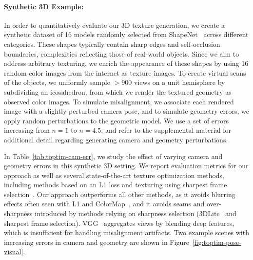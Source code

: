 \paragraph*{Synthetic 3D Example:}
In order to quantitatively evaluate our 3D texture generation, we create a synthetic dataset of 16 models randomly selected from ShapeNet~\cite{chang2015shapenet} across different categories. 
These shapes typically contain sharp edges and self-occlusion boundaries, complexities reflecting those of real-world objects.
Since we aim to address arbitrary texturing, we enrich the appearance of these shapes by using 16 random color images from the internet as texture images. 
To create virtual scans of the objects, we uniformly sample $>900$ views on a unit hemisphere by subdividing an icosahedron, from which we render the textured geometry as observed color images. 
To simulate misalignment, we associate each rendered image with a slightly perturbed camera pose, and to simulate geometry errors, we apply random perturbations to the geometric model.
We use a set of errors increasing from $n=1$ to $n=4.5$, and refer to the supplemental material for additional detail regarding generating camera and geometry perturbations.


In Table~\ref{tab:toptim-cam-err}, we study the effect of varying camera and geometry errors in this synthetic 3D setting.  We report evaluation metrics for our approach as well as several state-of-the-art texture optimization methods, including methods based on an L1 loss and texturing using sharpest frame selection~\cite{vu2011bf}.
Our approach outperforms all other methods, as it avoids blurring effects often seen with L1 and ColorMap~\cite{zhou2014color}, and it avoids seams and over-sharpness introduced by methods relying on sharpness selection (3DLite~\cite{huang20173dlite} and sharpest frame selection).
VGG~\cite{johnson2016perceptual} aggregates views by blending deep features, which is insufficient for handling misalignment artifacts.
Two example scenes with increasing errors in camera and geometry are shown in Figure~\ref{fig:toptim-pose-visual}.

